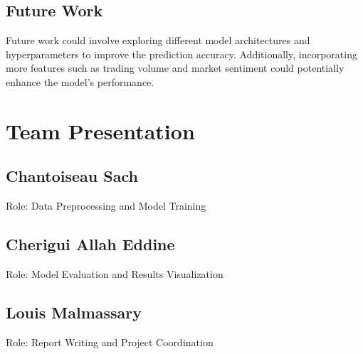 \documentclass{article}
\begin{document}
\subsection{Future Work}
Future work could involve exploring different model architectures and hyperparameters to improve the prediction accuracy. Additionally, incorporating more features such as trading volume and market sentiment could potentially enhance the model's performance.

\section{Team Presentation}
\subsection{Chantoiseau Sach}
Role: Data Preprocessing and Model Training

\subsection{Cherigui Allah Eddine}
Role: Model Evaluation and Results Visualization

\subsection{Louis Malmassary}
Role: Report Writing and Project Coordination
\end{document}
